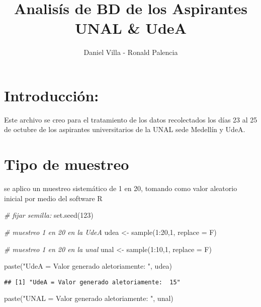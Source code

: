 \documentclass[
]{article}
\title{Analisís de BD de los Aspirantes UNAL \& UdeA}
\author{Daniel Villa - Ronald Palencia}
\date{}
\newenvironment{Shaded}{\begin{snugshade}}{\end{snugshade}}
\newcommand{\AttributeTok}[1]{\textcolor[rgb]{0.77,0.63,0.00}{#1}}
\newcommand{\CommentTok}[1]{\textcolor[rgb]{0.56,0.35,0.01}{\textit{#1}}}
\newcommand{\DecValTok}[1]{\textcolor[rgb]{0.00,0.00,0.81}{#1}}
\newcommand{\FunctionTok}[1]{\textcolor[rgb]{0.00,0.00,0.00}{#1}}
\newcommand{\NormalTok}[1]{#1}
\newcommand{\OtherTok}[1]{\textcolor[rgb]{0.56,0.35,0.01}{#1}}
\newcommand{\SpecialCharTok}[1]{\textcolor[rgb]{0.00,0.00,0.00}{#1}}
\newcommand{\StringTok}[1]{\textcolor[rgb]{0.31,0.60,0.02}{#1}}
\begin{document}
\maketitle

\hypertarget{introducciuxf3n}{%
\section{Introducción:}\label{introducciuxf3n}}

Este archivo se creo para el tratamiento de los datos recolectados los
días 23 al 25 de octubre de los aspirantes universitarios de la UNAL
sede Medellín y UdeA.

\hypertarget{tipo-de-muestreo}{%
\section{Tipo de muestreo}\label{tipo-de-muestreo}}

se aplico un muestreo sistemático de 1 en 20, tomando como valor
aleatorio inicial por medio del software R

\begin{Shaded}
\begin{Highlighting}[]
\CommentTok{\# fijar semilla:}
\FunctionTok{set.seed}\NormalTok{(}\DecValTok{123}\NormalTok{)}

\CommentTok{\# muestreo 1 en 20 en la UdeA}
\NormalTok{udea }\OtherTok{\textless{}{-}} \FunctionTok{sample}\NormalTok{(}\DecValTok{1}\SpecialCharTok{:}\DecValTok{20}\NormalTok{,}\DecValTok{1}\NormalTok{, }\AttributeTok{replace =}\NormalTok{ F)}


\CommentTok{\# muestreo 1 en 20 en la unal}
\NormalTok{unal }\OtherTok{\textless{}{-}} \FunctionTok{sample}\NormalTok{(}\DecValTok{1}\SpecialCharTok{:}\DecValTok{10}\NormalTok{,}\DecValTok{1}\NormalTok{, }\AttributeTok{replace =}\NormalTok{ F)}

\FunctionTok{paste}\NormalTok{(}\StringTok{"UdeA = Valor generado aletoriamente: "}\NormalTok{, udea)}
\end{Highlighting}
\end{Shaded}

\begin{verbatim}
## [1] "UdeA = Valor generado aletoriamente:  15"
\end{verbatim}

\begin{Shaded}
\begin{Highlighting}[]
\FunctionTok{paste}\NormalTok{(}\StringTok{"UNAL = Valor generado aletoriamente: "}\NormalTok{, unal)}
\end{Highlighting}
\end{Shaded}
\end{document}
